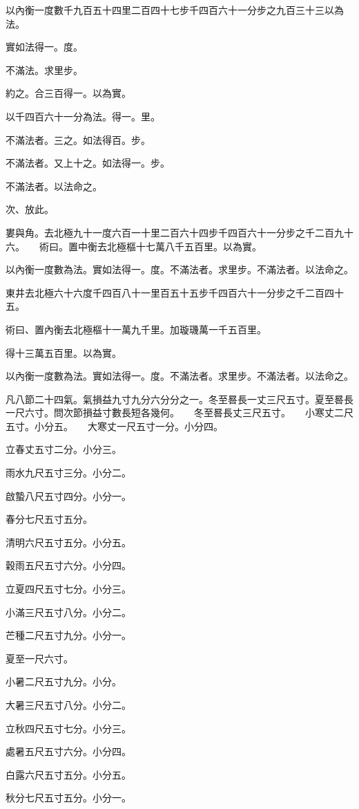 \documentclass[a4paper,12pt,UTF8,twoside]{ctexbook}
\begin{document}
以內衡一度數千九百五十四里二百四十七步千四百六十一分步之九百三十三以為法。

實如法得一。度。

不滿法。求里步。

約之。合三百得一。以為實。

以千四百六十一分為法。得一。里。

不滿法者。三之。如法得百。步。

不滿法者。又上十之。如法得一。步。

不滿法者。以法命之。

次、放此。

婁與角。去北極九十一度六百一十里二百六十四步千四百六十一分步之千二百九十六。　　術曰。置中衡去北極樞十七萬八千五百里。以為實。

以內衡一度數為法。實如法得一。度。不滿法者。求里步。不滿法者。以法命之。

東井去北極六十六度千四百八十一里百五十五步千四百六十一分步之千二百四十五。

術曰、置內衡去北極樞十一萬九千里。加璇璣萬一千五百里。

得十三萬五百里。以為實。

以內衡一度數為法。實如法得一。度。不滿法者。求里步。不滿法者。以法命之。

凡八節二十四氣。氣損益九寸九分六分分之一。冬至晷長一丈三尺五寸。夏至晷長一尺六寸。問次節損益寸數長短各幾何。　　冬至晷長丈三尺五寸。　　小寒丈二尺五寸。小分五。　　大寒丈一尺五寸一分。小分四。

立春丈五寸二分。小分三。

雨水九尺五寸三分。小分二。

啟蟄八尺五寸四分。小分一。

春分七尺五寸五分。

清明六尺五寸五分。小分五。

穀雨五尺五寸六分。小分四。

立夏四尺五寸七分。小分三。

小滿三尺五寸八分。小分二。

芒種二尺五寸九分。小分一。

夏至一尺六寸。

小暑二尺五寸九分。小分。

大暑三尺五寸八分。小分二。

立秋四尺五寸七分。小分三。

處暑五尺五寸六分。小分四。

白露六尺五寸五分。小分五。

秋分七尺五寸五分。小分一。
\end{document}
